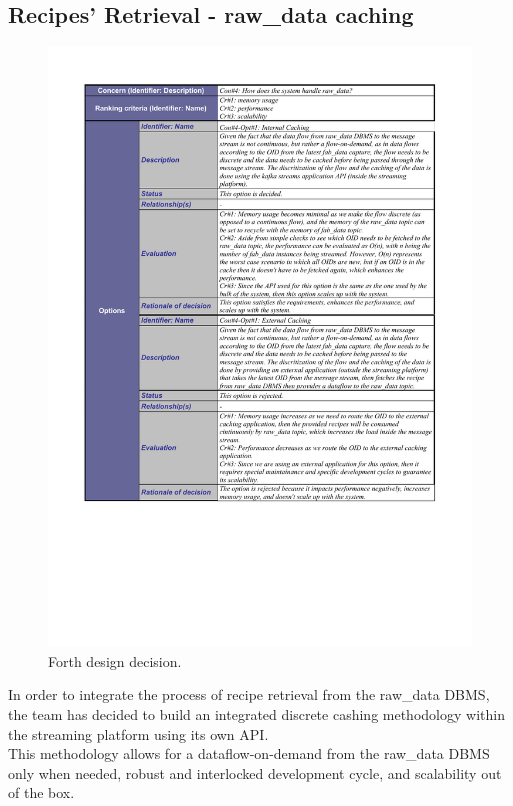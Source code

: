 \subsection{Recipes' Retrieval - raw\_data caching}
\label{forth_design_decision}
 \begin{figure}[H]
\centering
 \includegraphics[trim=1.3cm 6.5cm 1.3cm 1.3cm,clip=true, width=\textwidth]{dd/dd4.pdf}
\caption{Forth design decision.}
\end{figure}

In order to integrate the process of recipe retrieval from the raw\_data DBMS, the team has decided to build an integrated discrete cashing methodology within the streaming platform using its own API.\\
This methodology allows for a dataflow-on-demand from the raw\_data DBMS only when needed, robust and interlocked development cycle, and scalability out of the box.

